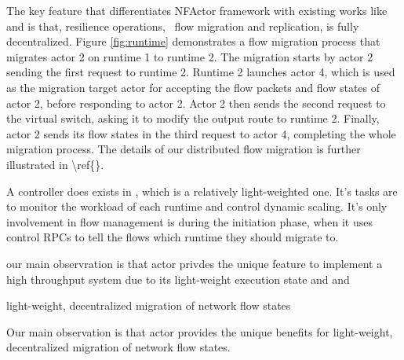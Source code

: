 The key feature that differentiates NFActor framework with existing works like \cite{gember2015opennf} and \cite{rajagopalan2013split} is that, resilience operations, \ie~flow migration and replication, is fully decentralized. Figure \ref{fig:runtime} demonstrates a flow migration process that migrates actor 2 on runtime 1 to runtime 2. \ac{The migration starts by actor 2 sending the first request to runtime 2. Runtime 2 launches actor 4, which is used as the migration target actor for accepting the flow packets and flow states of actor 2, before responding to actor 2. Actor 2 then sends the second request to the virtual switch, asking it to modify the output route to runtime 2. Finally, actor 2 sends its flow states in the third request to actor 4, completing the whole migration process. The details of our distributed flow migration is further illustrated in \ref{}.} 

A controller does exists in \nfactor, which is a relatively light-weighted one. It's tasks are to monitor the workload of each runtime and control dynamic scaling. It's only involvement in flow management is during the initiation phase, when it uses control RPCs to tell the flows which runtime they should migrate to.

our main observration is that actor privdes the unique feature to implement a high throughput system due to its light-weight execution state and and

light-weight, decentralized migration of network flow states

Our main observation is that actor provides the unique benefits for light-weight, decentralized migration of network flow states.
